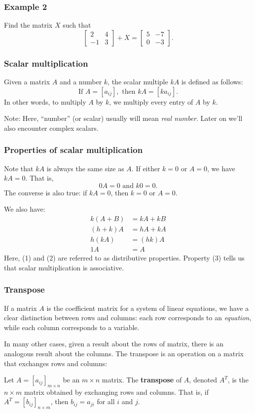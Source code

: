 \documentclass[12pt,t]{beamer}
\begin{document}
\begin{frame}\frametitle{Example 2}
 Find the matrix $X$ such that
\[
 \begin{bmatrix}2 & 4 \\ -1 & 3\end{bmatrix} + X = \begin{bmatrix}5 & -7\\0 & -3\end{bmatrix}.
\]

\end{frame}
\begin{frame}\frametitle{Scalar multiplication}
 Given a matrix $A$ and a number $k$, the \alert{scalar multiple} $kA$ is defined as follows:
\[
 \text{If } A = [a_{ij}], \text{ then } kA = [ka_{ij}].
\]
 In other words, to multiply $A$ by $k$, we multiply every entry of $A$ by $k$.

\bigskip

\alert{Note:} Here, ``number'' (or \alert{scalar}) usually will mean {\em real number}. Later on we'll also encounter complex scalars.
\end{frame}
\begin{frame}\frametitle{Properties of scalar multiplication}
 Note that $kA$ is always the same size as $A$. If either $k=0$ or $A=0$, we have $kA = 0$. That is,
\[
 0A = 0 \text{ and } k0 = 0.
\]
 The converse is also true: if $kA = 0$, then $k=0$ or $A=0$.

 We also have:
\begin{align}
 k(A+B) & = kA + kB \\
 (h+k)A & = hA +kA\\
 h(kA) & = (hk)A\\
 1A & = A
\end{align}
Here, (1) and (2) are referred to as \alert{distributive properties}. Property (3) tells us that scalar multiplication is \alert{associative}.
\end{frame}
\begin{frame}\frametitle{Transpose}
 If a matrix $A$ is the coefficient matrix for a system of linear equations, we have a clear distinction between rows and columns: each \alert{row} corresponds to an {\em equation}, while each \alert{column} corresponds to a variable.

 In many other cases, given a result about the rows of matrix, there is an analogous result about the columns. The \alert{transpose} is an operation on a matrix that exchanges rows and columns:

\begin{definition}
 Let $A = [a_{ij}]_{m\times n}$ be an $m\times n$ matrix. The {\bf transpose} of $A$, denoted $A^T$, is the $n\times m$ matrix obtained by exchanging rows and columns. That is, if $A^T=[b_{ij}]_{n\times m}$, then $b_{ij} = a_{ji}$ for all $i$ and $j$.
\end{definition}

\end{frame}
\end{document}
